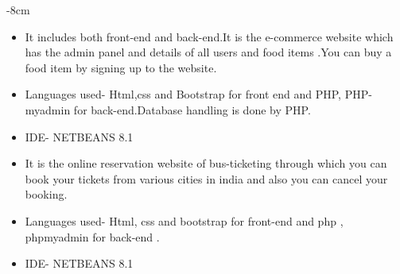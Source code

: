 \documentclass[10pt,a4paper]{altacv}
\begin{document}

\begin{adjustwidth}{}{-8cm}
\makecvheader
\end{adjustwidth}


\begin{itemize}
\item It includes both front-end and back-end.It is the e-commerce website which has the admin panel and details of all users and food items .You can buy a food item by signing up to the website.
\item Languages used- Html,css and Bootstrap for front end and PHP, PHP-myadmin for back-end.Database handling is done by PHP.
\item IDE- NETBEANS 8.1
\end{itemize}

\divider

\begin{itemize}
\item It is the online reservation website of bus-ticketing through which you can book your tickets from various cities in india and also you can cancel your booking. 
\item Languages used- Html, css and bootstrap for front-end and php , phpmyadmin for back-end .
\item IDE- NETBEANS 8.1
\end{itemize}
\end{document}
